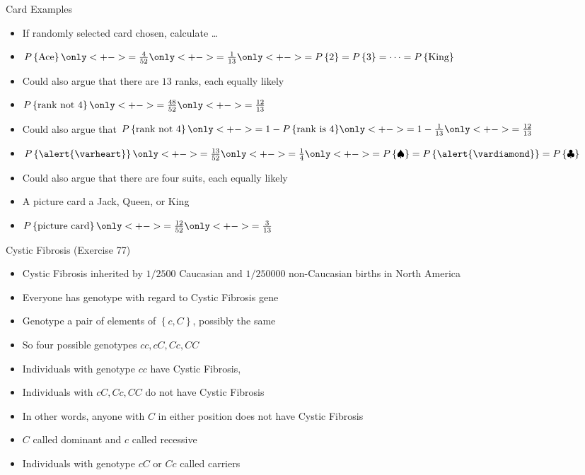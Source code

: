 \documentclass[handout]{beamer}
\theoremstyle{definition}
\begin{document}
\begin{frame}{Card Examples}
\begin{itemize}
\item If randomly selected card chosen, calculate \dots
\item $P\left\{\text{Ace}\right\}\only<+->{=\frac{4}{52}}
\only<+->{=\frac{1}{13}}
\only<+->{=P\left\{2\right\}=P\left\{3\right\}
=\cdots=P\left\{\text{King}\right\}}$
\item Could also argue that there are $13$ ranks, each equally likely
\item $P\left\{\text{rank not $4$}\right\}\only<+->{=\frac{48}{52}
\only<+->{=\frac{12}{13}}}$
\item Could also argue that
$P\left\{\text{rank not $4$}\right\}
\only<+->{=1-P\left\{\text{rank is $4$}\right\}}
\only<+->{=1-\frac{1}{13}}
\only<+->{=\frac{12}{13}}$
\item $P\left\{\alert{\varheart}\right\}
\only<+->{=\frac{13}{52}}\only<+->{=\frac{1}{4}}
\only<+->{=P\left\{\spadesuit\right\}
=P\left\{\alert{\vardiamond}\right\}
=P\left\{\clubsuit\right\}}$
\item Could also argue that there are four suits, each equally likely
\item A \alert{picture card} a Jack, Queen, or King
\item $P\left\{\text{picture card}\right\}
\only<+->{=\frac{12}{52}}
\only<+->{=\frac{3}{13}}$
\end{itemize}
\end{frame}

\begin{frame}{Cystic Fibrosis (Exercise 77)}
\begin{itemize}
\item Cystic Fibrosis inherited by $1/2500$ Caucasian
and $1/250000$ non-Caucasian births in North America
\item Everyone has \alert{genotype}
with regard to Cystic Fibrosis gene
\item \alert{Genotype} a pair of elements of
$\left\{c,C\right\}$, possibly the same
\item So four possible genotypes $cc,cC,Cc,CC$
\item Individuals with genotype $cc$ \alert{have} Cystic Fibrosis,
\item Individuals with $cC,Cc,CC$ do \alert{not} have Cystic Fibrosis
\item In other words, anyone with $C$ in either position
does \alert{not} have Cystic Fibrosis
\item $C$ called \alert{dominant} and $c$ called \alert{recessive}
\item Individuals with genotype $cC$ or $Cc$ called \alert{carriers}
\end{itemize}
\end{frame}
\end{document}
